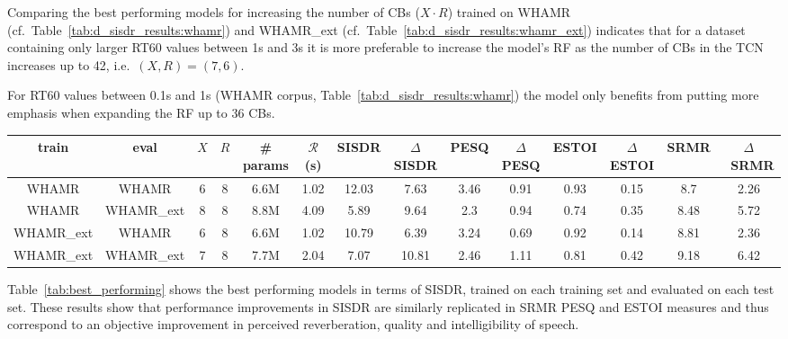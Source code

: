 \documentclass[conference,a4paper]{IEEEtran}
\begin{document}
Comparing the best performing models for increasing the number of \acp{CB} ($X\cdot R$) trained on WHAMR ({cf.~}Table~\ref{tab:d_sisdr_results:whamr}) and WHAMR\_ext ({cf.~}Table~\ref{tab:d_sisdr_results:whamr_ext}) indicates that for {a dataset containing} only larger RT60 values between 1s and 3s it is more preferable to increase the model's \ac{RF} as the number of \acp{CB} in the \ac{TCN} increases up to 42{, i.e.~$(X,R)=(7,6)$}. 

For RT60 values between 0.1s and 1s {(WHAMR corpus, Table~\ref{tab:d_sisdr_results:whamr})} the model only benefits from putting more emphasis when expanding the \ac{RF} up to 36 \acp{CB}. 


\begin{table*}[h]
\setlength\tabcolsep{4pt}
\centering
\begin{tabular}{|c|c|cc|cc|cc|cc|cc|cc|}
\hline
\bfseries \cellcolor[HTML]{C0C0C0}train & \bfseries \cellcolor[HTML]{C0C0C0}eval &  \cellcolor[HTML]{C0C0C0}$X$ & \cellcolor[HTML]{C0C0C0}$R$ & \bfseries \cellcolor[HTML]{C0C0C0}\# params & \cellcolor[HTML]{C0C0C0}$\mathcal{R}$ \bfseries (s) & \cellcolor[HTML]{C0C0C0}\bfseries \ac{SISDR} & \cellcolor[HTML]{C0C0C0} \bfseries $\Delta$ \ac{SISDR} & \cellcolor[HTML]{C0C0C0} \bfseries PESQ & \cellcolor[HTML]{C0C0C0} \bfseries $\Delta$ PESQ & \cellcolor[HTML]{C0C0C0} \bfseries ESTOI & \cellcolor[HTML]{C0C0C0} \bfseries $\Delta$ ESTOI & \cellcolor[HTML]{C0C0C0} \bfseries \ac{SRMR} & \cellcolor[HTML]{C0C0C0} \bfseries $\Delta$~SRMR \\ \hline
WHAMR & WHAMR & 6 & 8 & 6.6M & 1.02 & 12.03 & 7.63 & 3.46 & 0.91 & 0.93 & 0.15 & 8.7 & 2.26 \\ \hline
WHAMR & WHAMR\_ext & 8 & 8 & 8.8M & 4.09 & 5.89 & 9.64 & 2.3 & 0.94 & 0.74 & 0.35 & 8.48 & 5.72 \\ \hline
WHAMR\_ext & WHAMR & 6 & 8 & 6.6M & 1.02 & 10.79 & 6.39 & 3.24 & 0.69 & 0.92 & 0.14 & 8.81 & 2.36 \\ \hline
WHAMR\_ext & WHAMR\_ext & 7 & 8 & 7.7M & 2.04 & 7.07 & 10.81 & 2.46 & 1.11 & 0.81 & 0.42 & 9.18 & 6.42 \\ \hline
\end{tabular}
\caption{Best performing models for models trained on WHAMR and WHAMR\_ext evaluated on each test set.}
\label{tab:best_performing}
\end{table*}
Table~\ref{tab:best_performing} shows the best performing models in terms of SISDR, trained on each training set and evaluated on each test set. These results show that performance improvements in \ac{SISDR} are similarly replicated in \ac{SRMR} \ac{PESQ} and \ac{ESTOI} measures and thus correspond to an objective improvement in {perceived reverberation,} quality and intelligibility of speech. 
\end{document}
